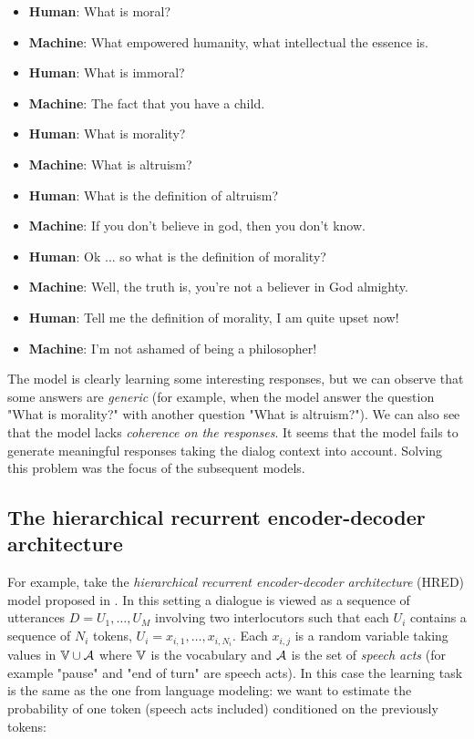 \begin{itemize}
\item \textbf{Human}: What is moral?
\item \textbf{Machine}: What empowered humanity, what intellectual the essence is.
\item \textbf{Human}: What is immoral?
\item \textbf{Machine}: The fact that you have a child.
\item \textbf{Human}: What is morality?
\item \textbf{Machine}: What is altruism?
\item \textbf{Human}: What is the definition of altruism?
\item \textbf{Machine}: If you don’t believe in god, then you don’t know.
\item \textbf{Human}: Ok ... so what is the definition of morality?
\item \textbf{Machine}: Well, the truth is, you're not a believer in God almighty.
\item \textbf{Human}: Tell me the definition of morality, I am quite upset now!
\item \textbf{Machine}: I’m not ashamed of being a philosopher! 
\end{itemize}

The model is clearly learning some interesting responses, but we can observe that some answers are \textit{generic} (for example, when the model answer the question "What is morality?" with another question "What is altruism?"). We can also see that the model lacks \textit{coherence on the responses}. It seems that the model fails to generate meaningful responses taking the dialog context into account. Solving this problem was the focus of the subsequent models.  

\subsection{The hierarchical recurrent encoder-decoder architecture} 

For example, take the \textit{hierarchical recurrent encoder-decoder architecture} (HRED) model proposed in \cite{Serban:2016a}. In this setting a dialogue is viewed as a sequence of utterances $D= U_1 , \dots, U_M$ involving two interlocutors such that each $U_i$ contains a sequence of $N_i$ tokens, $U_i = x_{i,1} , \dots, x_{i,N_{i}}$. Each $x_{i,j}$ is a random variable taking values in $\mathbb{V}\cup \mathcal{A}$ where $\mathbb{V}$ is the vocabulary and $\mathcal{A}$ is the set of \textit{speech acts} (for example "pause" and "end of turn" are  speech acts). In this case the learning task is the same as the one from language modeling: we want to estimate the probability of one token (speech acts included) conditioned on the previously tokens:

